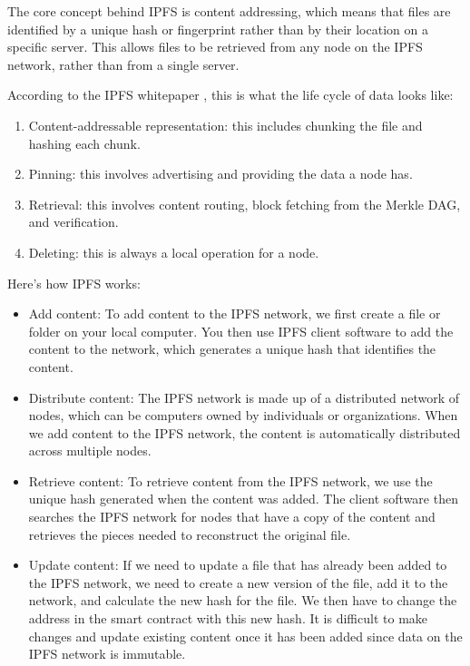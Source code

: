 \documentclass{article}
\begin{document}
The core concept behind IPFS is content addressing, which means that files are identified by a unique hash or fingerprint rather than by their location on a specific server. This allows files to be retrieved from any node on the IPFS network, rather than from a single server.

According to the IPFS whitepaper \cite{ipfsWhitepaper}, this is what the life cycle of data looks like:

\begin{enumerate}
    \item Content-addressable representation: this includes chunking the file and hashing each chunk.
    \item Pinning: this involves advertising and providing the data a node has.
    \item Retrieval: this involves content routing, block fetching from the Merkle DAG, and verification.
    \item Deleting: this is always a local operation for a node.
\end{enumerate}

Here's how IPFS works:

\begin{itemize}
    \item Add content: To add content to the IPFS network, we first create a file or folder on your local computer. You then use IPFS client software to add the content to the network, which generates a unique hash that identifies the content.
    \item Distribute content: The IPFS network is made up of a distributed network of nodes, which can be computers owned by individuals or organizations. When we add content to the IPFS network, the content is automatically distributed across multiple nodes.
    \item Retrieve content: To retrieve content from the IPFS network, we use the unique hash generated when the content was added. The client software then searches the IPFS network for nodes that have a copy of the content and retrieves the pieces needed to reconstruct the original file.
    \item Update content: If we need to update a file that has already been added to the IPFS network, we need to create a new version of the file, add it to the network, and calculate the new hash for the file. We then have to change the address in the smart contract with this new hash. It is difficult to make changes and update existing content once it has been added since data on the IPFS network is immutable.
\end{itemize}
\end{document}

